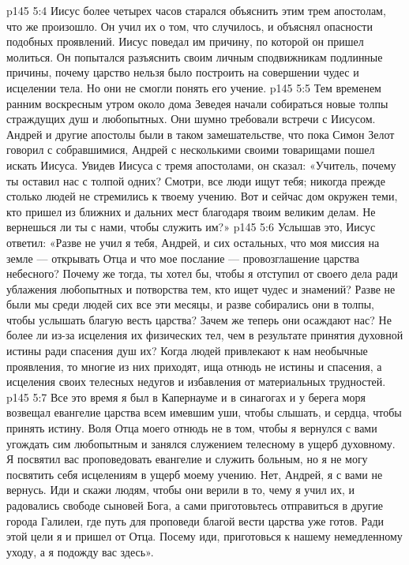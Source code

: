 \vs p145 5:4 Иисус более четырех часов старался объяснить этим трем апостолам, что же произошло. Он учил их о том, что случилось, и объяснял опасности подобных проявлений. Иисус поведал им причину, по которой он пришел молиться. Он попытался разъяснить своим личным сподвижникам подлинные причины, почему царство нельзя было построить на совершении чудес и исцелении тела. Но они не смогли понять его учение.
\vs p145 5:5 Тем временем ранним воскресным утром около дома Зеведея начали собираться новые толпы страждущих душ и любопытных. Они шумно требовали встречи с Иисусом. Андрей и другие апостолы были в таком замешательстве, что пока Симон Зелот говорил с собравшимися, Андрей с несколькими своими товарищами пошел искать Иисуса. Увидев Иисуса с тремя апостолами, он сказал: «Учитель, почему ты оставил нас с толпой одних? Смотри, все люди ищут тебя; никогда прежде столько людей не стремились к твоему учению. Вот и сейчас дом окружен теми, кто пришел из ближних и дальних мест благодаря твоим великим делам. Не вернешься ли ты с нами, чтобы служить им?»
\vs p145 5:6 Услышав это, Иисус ответил: «Разве не учил я тебя, Андрей, и сих остальных, что моя миссия на земле --- открывать Отца и что мое послание --- провозглашение царства небесного? Почему же тогда, ты хотел бы, чтобы я отступил от своего дела ради ублажения любопытных и потворства тем, кто ищет чудес и знамений? Разве не были мы среди людей сих все эти месяцы, и разве собирались они в толпы, чтобы услышать благую весть царства? Зачем же теперь они осаждают нас? Не более ли из\hyp{}за исцеления их физических тел, чем в результате принятия духовной истины ради спасения душ их? Когда людей привлекают к нам необычные проявления, то многие из них приходят, ища отнюдь не истины и спасения, а исцеления своих телесных недугов и избавления от материальных трудностей.
\vs p145 5:7 Все это время я был в Капернауме и в синагогах и у берега моря возвещал евангелие царства всем имевшим уши, чтобы слышать, и сердца, чтобы принять истину. Воля Отца моего отнюдь не в том, чтобы я вернулся с вами угождать сим любопытным и занялся служением телесному в ущерб духовному. Я посвятил вас проповедовать евангелие и служить больным, но я не могу посвятить себя исцелениям в ущерб моему учению. Нет, Андрей, я с вами не вернусь. Иди и скажи людям, чтобы они верили в то, чему я учил их, и радовались свободе сыновей Бога, а сами приготовьтесь отправиться в другие города Галилеи, где путь для проповеди благой вести царства уже готов. Ради этой цели я и пришел от Отца. Посему иди, приготовься к нашему немедленному уходу, а я подожду вас здесь».
